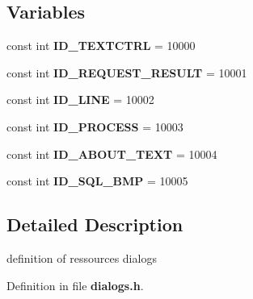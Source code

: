 \subsection*{Variables}
\begin{CompactItemize}
\item 
const int {\bf ID\_\-TEXTCTRL} = 10000\label{dialogs_8h_d8c00f4d2462436d3ba38d0bc2b250e8}

\item 
const int {\bf ID\_\-REQUEST\_\-RESULT} = 10001\label{dialogs_8h_2e45522bf75ec33dde5ed328b2970400}

\item 
const int {\bf ID\_\-LINE} = 10002\label{dialogs_8h_5f853243a669a6ebbb8f408d82b3b5ad}

\item 
const int {\bf ID\_\-PROCESS} = 10003\label{dialogs_8h_7a6fa0cbe917fb50451ce34823e2322c}

\item 
const int {\bf ID\_\-ABOUT\_\-TEXT} = 10004\label{dialogs_8h_77521bbf66b6f091572dcfe622e851c3}

\item 
const int {\bf ID\_\-SQL\_\-BMP} = 10005\label{dialogs_8h_94ba4a96055f93269c8d097c060f7183}

\end{CompactItemize}


\subsection{Detailed Description}
definition of ressources dialogs 



Definition in file {\bf dialogs.h}.